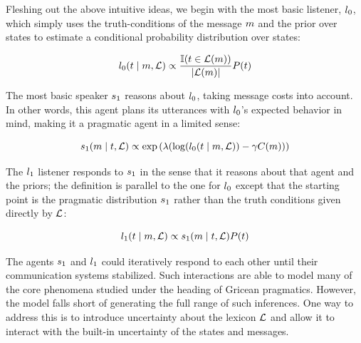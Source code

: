 Fleshing out the above intuitive ideas, we begin with the most basic
listener, $\listenerZero$, which simply uses the truth-conditions of
the message $m$ and the prior over states to estimate a conditional
probability distribution over states:

\begin{definition}[$\listenerZero$]\label{def:l0}
  \[
  l_{0}(t \mid m, \mathcal{L})
  \propto
  \frac{\mathbb{I}(t \in \mathcal{L}(m))}{|\mathcal{L}(m)|}
  P(t)
  \]
\end{definition}

The most basic speaker $\speakerOne$ reasons about $\listenerZero$,
taking message costs into account. In other words, this agent plans
its utterances with $\listenerZero$'s expected behavior in mind,
making it a pragmatic agent in a limited sense:



\begin{definition}[$\speakerOne$]\label{def:s1}  
  \[
  s_{1}(m \mid t, \mathcal{L}) 
  \propto
  \exp
  \left(
    \lambda
    (
      \log
      (l_{0}(t \mid m, \mathcal{L}))
      - \gamma C(m)
     )
  \right)
  \]
\end{definition}

The $\listenerOne$ listener responds to $\speakerOne$ in the sense
that it reasons about that agent and the priors; the definition is
parallel to the one for $\listenerZero$ except that the starting point
is the pragmatic distribution $\speakerOne$ rather than the truth
conditions given directly by $\mathcal{L}$:

\begin{definition}[$\listenerOne$]\label{def:l1}
  \[
  l_{1}(t \mid m, \mathcal{L}) 
  \propto 
  s_{1}(m \mid t, \mathcal{L})P(t)
  \]
\end{definition}


The agents $\speakerOne$ and $\listenerOne$ could iteratively respond
to each other until their communication systems stabilized. Such
interactions are able to model many of the core phenomena studied
under the heading of Gricean pragmatics.  However, the model falls
short of generating the full range of such inferences.  One way to
address this is to introduce uncertainty about the lexicon $\mathcal{L}$ and
allow it to interact with the built-in uncertainty of the states and
messages.

